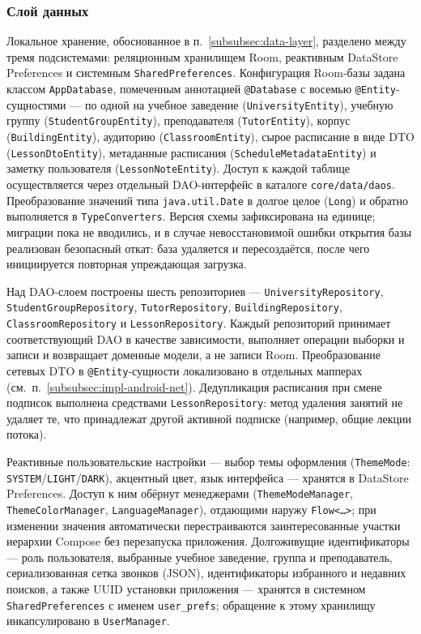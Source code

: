 \subsubsection{Слой данных}
\label{subsubsec:impl-android-data}

Локальное хранение, обоснованное в п.~\ref{subsubsec:data-layer}, разделено между тремя подсистемами: реляционным хранилищем Room, реактивным DataStore Preferences и системным \texttt{SharedPreferences}. Конфигурация Room-базы задана классом \texttt{AppDatabase}, помеченным аннотацией \texttt{@Database} с восемью \texttt{@Entity}-сущностями --- по одной на учебное заведение (\texttt{University\allowbreak Entity}), учебную группу (\texttt{StudentGroup\allowbreak Entity}), преподавателя (\texttt{Tutor\allowbreak Entity}), корпус (\texttt{Building\allowbreak Entity}), аудиторию (\texttt{Classroom\allowbreak Entity}), сырое расписание в виде DTO (\texttt{LessonDto\allowbreak Entity}), метаданные расписания (\texttt{Schedule\allowbreak MetadataEntity}) и заметку пользователя (\texttt{LessonNote\allowbreak Entity}). Доступ к каждой таблице осуществляется через отдельный DAO-интерфейс в каталоге \texttt{core/\allowbreak data/\allowbreak daos}. Преобразование значений типа \texttt{java.\allowbreak util.\allowbreak Date} в долгое целое (\texttt{Long}) и обратно выполняется в \texttt{TypeConverters}. Версия схемы зафиксирована на единице; миграции пока не вводились, и в случае невосстановимой ошибки открытия базы реализован безопасный откат: база удаляется и пересоздаётся, после чего инициируется повторная упреждающая загрузка.

Над DAO-слоем построены шесть репозиториев --- \texttt{University\allowbreak Repository}, \texttt{StudentGroup\allowbreak Repository}, \texttt{Tutor\allowbreak Repository}, \texttt{Building\allowbreak Repository}, \texttt{Classroom\allowbreak Repository} и \texttt{LessonRepository}. Каждый репозиторий принимает соответствующий DAO в качестве зависимости, выполняет операции выборки и записи и возвращает доменные модели, а не записи Room. Преобразование сетевых DTO в \texttt{@Entity}-сущности локализовано в отдельных мапперах (см.~п.~\ref{subsubsec:impl-android-net}). Дедупликация расписания при смене подписок выполнена средствами \texttt{LessonRepository}: метод удаления занятий не удаляет те, что принадлежат другой активной подписке (например, общие лекции потока).

Реактивные пользовательские настройки --- выбор темы оформления (\texttt{ThemeMode}: \texttt{SYSTEM}/\texttt{LIGHT}/\texttt{DARK}), акцентный цвет, язык интерфейса --- хранятся в DataStore Preferences. Доступ к ним обёрнут менеджерами (\texttt{ThemeMode\allowbreak Manager}, \texttt{ThemeColor\allowbreak Manager}, \texttt{Language\allowbreak Manager}), отдающими наружу \texttt{Flow<\dots>}; при изменении значения автоматически перестраиваются заинтересованные участки иерархии Compose без перезапуска приложения. Долгоживущие идентификаторы --- роль пользователя, выбранные учебное заведение, группа и преподаватель, сериализованная сетка звонков (JSON), идентификаторы избранного и недавних поисков, а также UUID установки приложения --- хранятся в системном \texttt{SharedPreferences} с именем \texttt{user\_prefs}; обращение к этому хранилищу инкапсулировано в \texttt{UserManager}.


